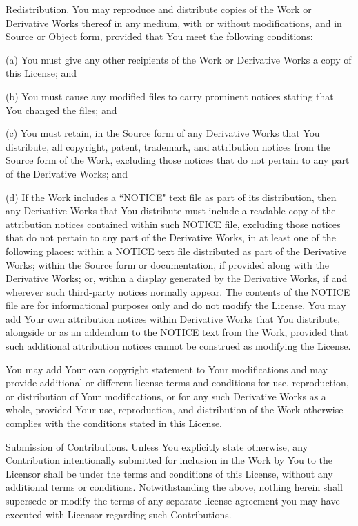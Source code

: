 \begin{numul}
	\item 
	Redistribution. You may reproduce and distribute copies of the
	Work or Derivative Works thereof in any medium, with or without
	modifications, and in Source or Object form, provided that You
	meet the following conditions:
	
	(a) You must give any other recipients of the Work or
	Derivative Works a copy of this License; and
	
	(b) You must cause any modified files to carry prominent notices
	stating that You changed the files; and
	
	(c) You must retain, in the Source form of any Derivative Works
	that You distribute, all copyright, patent, trademark, and
	attribution notices from the Source form of the Work,
	excluding those notices that do not pertain to any part of
	the Derivative Works; and
	
	(d) If the Work includes a ``NOTICE" text file as part of its
	distribution, then any Derivative Works that You distribute must
	include a readable copy of the attribution notices contained
	within such NOTICE file, excluding those notices that do not
	pertain to any part of the Derivative Works, in at least one
	of the following places: within a NOTICE text file distributed
	as part of the Derivative Works; within the Source form or
	documentation, if provided along with the Derivative Works; or,
	within a display generated by the Derivative Works, if and
	wherever such third-party notices normally appear. The contents
	of the NOTICE file are for informational purposes only and
	do not modify the License. You may add Your own attribution
	notices within Derivative Works that You distribute, alongside
	or as an addendum to the NOTICE text from the Work, provided
	that such additional attribution notices cannot be construed
	as modifying the License.
	
	You may add Your own copyright statement to Your modifications and
	may provide additional or different license terms and conditions
	for use, reproduction, or distribution of Your modifications, or
	for any such Derivative Works as a whole, provided Your use,
	reproduction, and distribution of the Work otherwise complies with
	the conditions stated in this License.
	
	\item 
	Submission of Contributions. Unless You explicitly state otherwise,
	any Contribution intentionally submitted for inclusion in the Work
	by You to the Licensor shall be under the terms and conditions of
	this License, without any additional terms or conditions.
	Notwithstanding the above, nothing herein shall supersede or modify
	the terms of any separate license agreement you may have executed
	with Licensor regarding such Contributions.
	

\end{numul}
